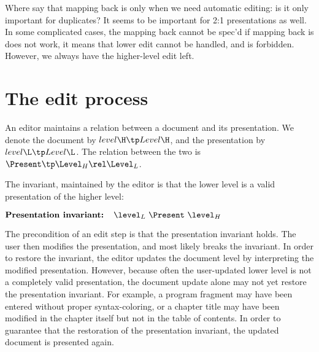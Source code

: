 

\bc
Where say that mapping back is only when we need automatic editing: is it only important for duplicates? It seems to be important for 2:1 presentations as well.  In some complicated cases, the mapping back cannot be spec'd if mapping back is does not work, it means that lower edit cannot be handled, and is forbidden. However, we always have the higher-level edit left.
\ec



%																
%																
%																
\section{The edit process}\label{sect:editProces}

An editor maintains a relation between a document and its presentation. We denote the document by $level\H \tp Level\H$, and the presentation by $level\L \tp Level\L$. The relation between the two is $\Present \tp \Level_{H} \rel \Level_{L}$. 

The invariant, maintained by the editor is that the lower level is a valid presentation of the higher level:

\begin{math}
\text{\bf Presentation invariant:~~~} \level_{L}~\Present~\level_{H}\\
\end{math}

The precondition of an edit step is that the presentation invariant holds. The user then modifies the presentation, and most likely breaks the invariant. In order to restore the invariant, the editor updates the document level by interpreting the modified presentation. However, because often the user-updated lower level is not a completely valid presentation, the document update alone may not yet restore the presentation invariant. For example, a program fragment may have been entered without proper syntax-coloring, or a chapter title may have been modified in the chapter itself but not in the table of contents. In order to guarantee that the restoration of the presentation invariant, the updated document is presented again.

